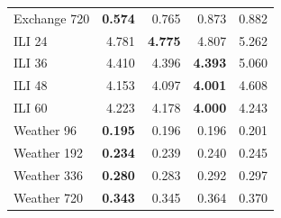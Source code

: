 \begin{table}[htbp]
\begin{tabular}{lrrrr}
Exchange 720 & \textbf{0.574} & 0.765 & 0.873 & 0.882 \\
ILI 24 & 4.781 & \textbf{4.775} & 4.807 & 5.262 \\
ILI 36 & 4.410 & 4.396 & \textbf{4.393} & 5.060 \\
ILI 48 & 4.153 & 4.097 & \textbf{4.001} & 4.608 \\
ILI 60 & 4.223 & 4.178 & \textbf{4.000} & 4.243 \\
Weather 96 & \textbf{0.195} & 0.196 & 0.196 & 0.201 \\
Weather 192 & \textbf{0.234} & 0.239 & 0.240 & 0.245 \\
Weather 336 & \textbf{0.280} & 0.283 & 0.292 & 0.297 \\
Weather 720 & \textbf{0.343} & 0.345 & 0.364 & 0.370 \\
\bottomrule
\end{tabular}
\end{table}
